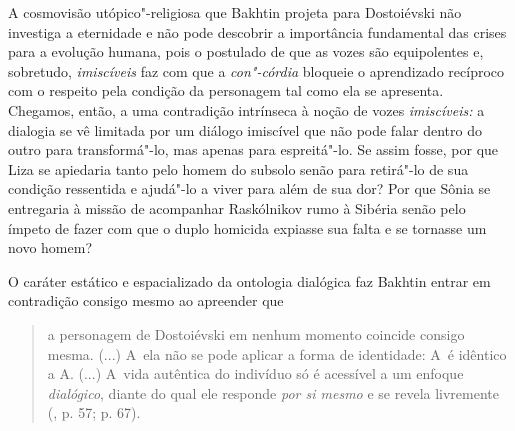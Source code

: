 {{A cosmovisão utópico"-religiosa que Bakhtin projeta para Dostoiévski não
investiga a eternidade e não pode descobrir a importância fundamental
das crises para a evolução humana, pois o postulado de que as vozes são
equipolentes e, sobretudo, \emph{imiscíveis} faz com que a
\emph{con"-córdia} bloqueie o aprendizado recíproco com o respeito pela
condição da personagem tal como ela se apresenta. Chegamos, então, a uma
contradição intrínseca à noção de vozes \emph{imiscíveis:} a dialogia se
vê limitada por um diálogo imiscível que não pode falar dentro do outro
para transformá"-lo, mas apenas para espreitá"-lo. Se assim fosse, por que
Liza se apiedaria tanto pelo homem do subsolo senão para retirá"-lo de
sua condição ressentida e ajudá"-lo a viver para além de sua dor? Por que
Sônia se entregaria à missão de acompanhar Raskólnikov rumo à Sibéria
senão pelo ímpeto de fazer com que o duplo homicida expiasse sua falta e
se tornasse um novo homem?

O caráter estático e espacializado da ontologia dialógica faz Bakhtin
entrar em contradição consigo mesmo ao apreender que

\begin{quote}
a personagem de Dostoiévski em nenhum momento coincide consigo mesma.
(...) A~ela não se pode aplicar a forma de identidade: A~é idêntico a A.
(...) A~vida autêntica do indivíduo só é acessível a um enfoque
\emph{dialógico}, diante do qual ele responde \emph{por si mesmo} e se
revela livremente (, p. 57; p. 67).
\end{quote}

}}
